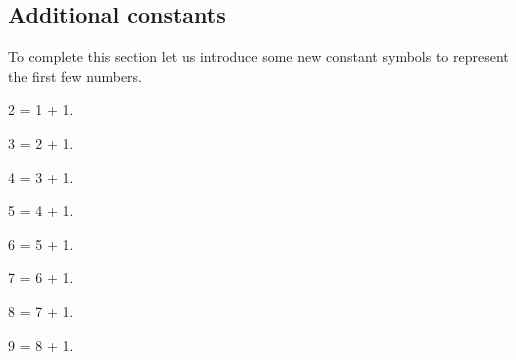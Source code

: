 \subsection{Additional constants}
To complete this section let us introduce some new constant symbols to represent
the first few numbers.

\begin{forthel}
\begin{definition}[0111]
2 = 1 + 1.
\end{definition}

\begin{definition}[0112]
3 = 2 + 1.
\end{definition}

\begin{definition}[0113]
4 = 3 + 1.
\end{definition}

\begin{definition}[0114]
5 = 4 + 1.
\end{definition}

\begin{definition}[0115]
6 = 5 + 1.
\end{definition}

\begin{definition}[0116]
7 = 6 + 1.
\end{definition}

\begin{definition}[0117]
8 = 7 + 1.
\end{definition}

\begin{definition}[0118]
9 = 8 + 1.
\end{definition}
\end{forthel}